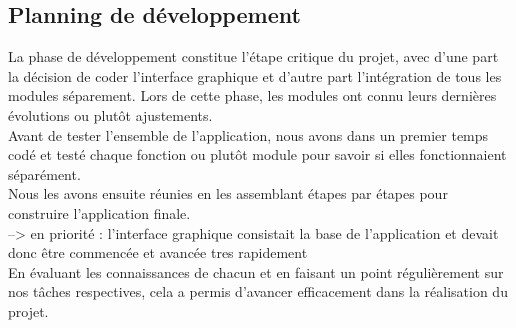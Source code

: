 \documentclass[a4]{article}
\begin{document}
		\subsection{Planning de développement}
		La phase de développement constitue l’étape critique du projet, avec d’une part la décision de coder l’interface graphique
et d’autre part l’intégration de tous les modules séparement. Lors de cette phase, les modules ont connu leurs dernières évolutions ou plutôt ajustements. \\
Avant de tester l’ensemble de l’application, nous avons dans un premier temps codé et
testé chaque fonction ou plutôt module pour savoir si elles fonctionnaient séparément. \\
Nous les avons ensuite
réunies en les assemblant étapes par étapes pour construire l’application finale.  \\
--> en priorité : l'interface graphique consistait la base de l'application et devait donc être commencée et avancée tres rapidement \\
En évaluant les connaissances de chacun et en faisant un point régulièrement sur nos tâches respectives, cela a permis 
d'avancer efficacement dans la réalisation du projet.
\end{document}
